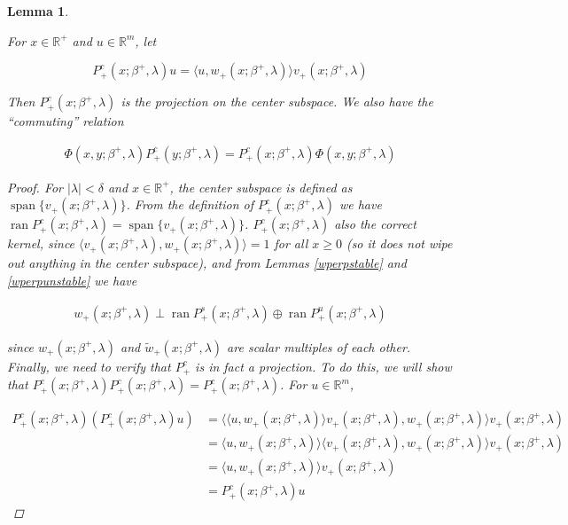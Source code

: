 \documentclass[12pt]{article}
\def\R{{\mathbb R}}
\DeclareMathOperator{\spn}{span}
\DeclareMathOperator{\ran}{ran}
\newtheorem{lemma}{Lemma}
\begin{document}
\begin{lemma}\label{centerproj}

For $x \in \R^+$ and $u \in \R^m$, let

\begin{equation}
P^c_+(x; \beta^+, \lambda)u = \langle u, w_+(x; \beta^+, \lambda) \rangle v_+(x; \beta^+, \lambda)
\end{equation}

Then $P^c_+(x; \beta^+, \lambda)$ is the projection on the center subspace. We also have the ``commuting'' relation

\begin{align*}
\Phi(x, y; \beta^+, \lambda) P^c_+(y; \beta^+, \lambda) 
= P^c_+(x; \beta^+, \lambda) \Phi(x, y; \beta^+, \lambda)
\end{align*}

\begin{proof}

For $|\lambda| < \delta$ and $x \in \R^+$, the center subspace is defined as $\spn \{ v_+(x; \beta^+, \lambda) \}$. From the definition of $P^c_+(x; \beta^+, \lambda)$ we have $\ran P^c_+(x; \beta^+, \lambda) = \spn \{ v_+(x; \beta^+, \lambda) \}$. $P^c_+(x; \beta^+, \lambda)$ also the correct kernel, since $\langle v_+(x; \beta^+, \lambda), w_+(x; \beta^+, \lambda) \rangle = 1$ for all $x \geq 0$ (so it does not wipe out anything in the center subspace), and from Lemmas \ref{wperpstable} and \ref{wperpunstable} we have

\begin{align*}
w_+(x; \beta^+, \lambda) \perp \ran P^s_+(x; \beta^+, \lambda) \oplus \ran P^u_+(x; \beta^+, \lambda)
\end{align*}

since $w_+(x; \beta^+, \lambda)$ and $\tilde{w}_+(x; \beta^+, \lambda)$ are scalar multiples of each other.\\

Finally, we need to verify that $P^c_+$ is in fact a projection. To do this, we will show that $P^c_+(x; \beta^+, \lambda)P^c_+(x; \beta^+, \lambda) = P^c_+(x; \beta^+, \lambda)$. For $u \in \R^m$,

\begin{align*}
P^c_+(x; \beta^+, \lambda)( P^c_+(x; \beta^+, \lambda) u ) &= \langle \langle u, w_+(x; \beta^+, \lambda) \rangle v_+(x; \beta^+, \lambda), w_+(x; \beta^+, \lambda) \rangle v_+(x; \beta^+, \lambda) \\
&= \langle u, w_+(x; \beta^+, \lambda) \rangle \langle v_+(x; \beta^+, \lambda), w_+(x; \beta^+, \lambda) \rangle v_+(x; \beta^+, \lambda) \\
&= \langle u, w_+(x; \beta^+, \lambda) \rangle v_+(x; \beta^+, \lambda) \\
&= P^c_+(x; \beta^+, \lambda) u 
\end{align*}


\end{proof}
\end{lemma}
\end{document}

